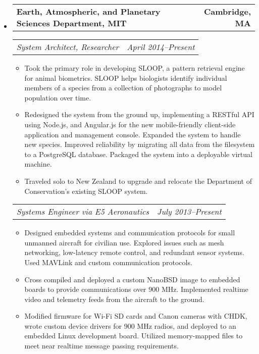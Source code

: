 \documentclass[10pt,letterpaper]{article}
\newcommand{\headerrow}[2]{%
    \begin{tabularx}{\linewidth}{Xr}
	    #1 & #2 \\
    \end{tabularx}
}
\begin{document}
\begin{itemize}
    \item
    \headerrow{\textbf{Earth, Atmospheric, and Planetary Sciences Department, MIT}}
        {\textbf{Cambridge, MA}}
    \headerrow{\emph{System Architect, Researcher}}{\emph{April 2014--Present}}
    \begin{itemize}
        \item Took the primary role in developing SLOOP, a pattern retrieval
            engine for animal biometrics.  SLOOP helps biologists identify
            individual members of a species from a collection of photographs to
            model population over time.

        \item Redesigned the system from the ground up, implementing a RESTful
            API using Node.js, and Angular.js for the new mobile-friendly
            client-side application and management console. Expanded the system
            to handle new species.  Improved reliability by migrating all data
            from the filesystem to a PostgreSQL database.  Packaged the system
            into a deployable virtual machine.

        \item Traveled solo to New Zealand to upgrade and relocate the
            Department of Conservation's existing SLOOP system.
    \end{itemize}

    \headerrow{\emph{Systems Engineer via E5 Aeronautics}}
        {\emph{July 2013--Present}}
    \begin{itemize}
        \item Designed embedded systems and communication protocols for small
            unmanned aircraft for civilian use.  Explored
            issues such as mesh networking, low-latency remote control, and
            redundant sensor systems.  Used MAVLink and custom communication
            protocols.

        \item Cross compiled and deployed a custom NanoBSD image to embedded
            boards to provide communications over 900 MHz.  Implemented
            realtime video and telemetry feeds from the aircraft to the ground.

        \item Modified firmware for Wi-Fi SD cards and Canon cameras with CHDK,
            wrote custom device drivers for 900 MHz radios, and deployed to an
            embedded Linux development board.  Utilized memory-mapped files to
            meet near realtime message passing requirements.


\end{itemize}
\end{itemize}
\end{document}
